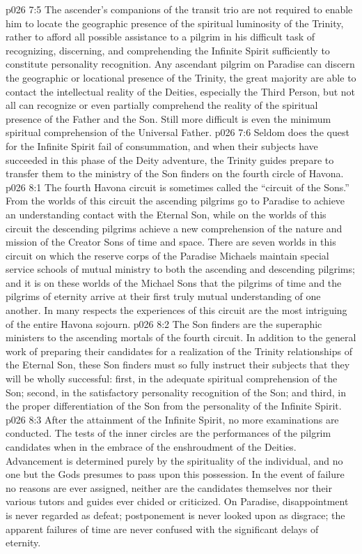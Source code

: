 \pc \vs p026 7:5 The ascender’s companions of the transit trio are not required to enable him to locate the geographic presence of the spiritual luminosity of the Trinity, rather to afford all possible assistance to a pilgrim in his difficult task of recognizing, discerning, and comprehending the Infinite Spirit sufficiently to constitute personality recognition. Any ascendant pilgrim on Paradise can discern the geographic or locational presence of the Trinity, the great majority are able to contact the intellectual reality of the Deities, especially the Third Person, but not all can recognize or even partially comprehend the reality of the spiritual presence of the Father and the Son. Still more difficult is even the minimum spiritual comprehension of the Universal Father.
\vs p026 7:6 Seldom does the quest for the Infinite Spirit fail of consummation, and when their subjects have succeeded in this phase of the Deity adventure, the Trinity guides prepare to transfer them to the ministry of the Son finders on the fourth circle of Havona.
\vs p026 8:1 The fourth Havona circuit is sometimes called the “circuit of the Sons.” From the worlds of this circuit the ascending pilgrims go to Paradise to achieve an understanding contact with the Eternal Son, while on the worlds of this circuit the descending pilgrims achieve a new comprehension of the nature and mission of the Creator Sons of time and space. There are seven worlds in this circuit on which the reserve corps of the Paradise Michaels maintain special service schools of mutual ministry to both the ascending and descending pilgrims; and it is on these worlds of the Michael Sons that the pilgrims of time and the pilgrims of eternity arrive at their first truly mutual understanding of one another. In many respects the experiences of this circuit are the most intriguing of the entire Havona sojourn.\plusone
\vs p026 8:2 The Son finders are the superaphic ministers to the ascending mortals of the fourth circuit. In addition to the general work of preparing their candidates for a realization of the Trinity relationships of the Eternal Son, these Son finders must so fully instruct their subjects that they will be wholly successful: first, in the adequate spiritual comprehension of the Son; second, in the satisfactory personality recognition of the Son; and third, in the proper differentiation of the Son from the personality of the Infinite Spirit.
\vs p026 8:3 After the attainment of the Infinite Spirit, no more examinations are conducted. The tests of the inner circles are the performances of the pilgrim candidates when in the embrace of the enshroudment of the Deities. Advancement is determined purely by the spirituality of the individual, and no one but the Gods presumes to pass upon this possession. In the event of failure no reasons are ever assigned, neither are the candidates themselves nor their various tutors and guides ever chided or criticized. On Paradise, disappointment is never regarded as defeat; postponement is never looked upon as disgrace; the apparent failures of time are never confused with the significant delays of eternity.\plusone
